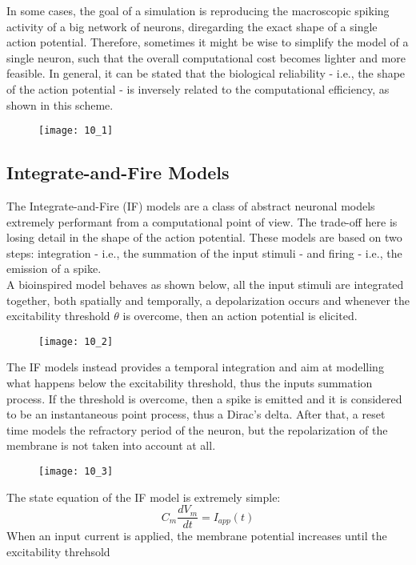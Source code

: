 In some cases, the goal of a simulation is reproducing the macroscopic spiking activity
of a big network of neurons, diregarding the exact shape of a single action potential.
Therefore, sometimes it might be wise to simplify the model of a single neuron, such that
the overall computational cost becomes lighter and more feasible. In general, it can be
stated that the biological reliability - i.e., the shape of the action potential - is
inversely related to the computational efficiency, as shown in this scheme.
\begin{figure}[H]
    \texttt{[image: 10\_1]}
    \centering
\end{figure}

\subsection{Integrate-and-Fire Models}
The Integrate-and-Fire (IF) models are a class of abstract neuronal models extremely performant
from a computational point of view. The trade-off here is losing detail in the shape of the
action potential. These models are based on two steps: integration - i.e., the summation of the
input stimuli - and firing - i.e., the emission of a spike.\\
A bioinspired model behaves as shown below, all the input stimuli are integrated together,
both spatially and temporally, a depolarization occurs and whenever the excitability threshold
\(\theta\) is overcome, then an action potential is elicited.
\begin{figure}[H]
    \texttt{[image: 10\_2]}
    \centering
\end{figure}
The IF models instead provides a temporal integration and aim at modelling what happens below the
excitability threshold, thus the inputs summation process. If the threshold is overcome, then
a spike is emitted and it is considered to be an instantaneous point process, thus a Dirac's delta.
After that, a reset time models the refractory period of the neuron, but the repolarization of the
membrane is not taken into account at all.
\begin{figure}[H]
    \texttt{[image: 10\_3]}
    \centering
\end{figure}
The state equation of the IF model is extremely simple:
\begin{equation*}
    C_{m}\frac{dV_{m}}{dt}=I_{app}(t)
\end{equation*}
When an input current is applied, the membrane potential increases until the excitability threhsold
